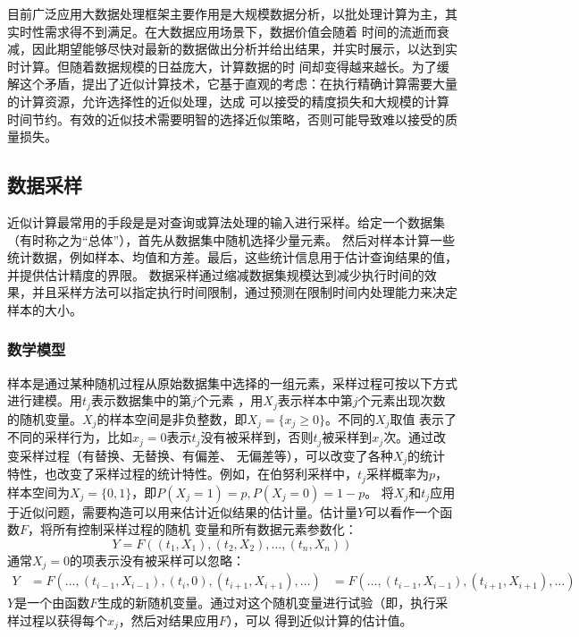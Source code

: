 \documentclass[master]{thesis-uestc}
\begin{document}
    目前广泛应用大数据处理框架主要作用是大规模数据分析，以批处理计算为主，其实时性需求得不到满足。在大数据应用场景下，数据价值会随着
时间的流逝而衰减，因此期望能够尽快对最新的数据做出分析并给出结果，并实时展示，以达到实时计算。但随着数据规模的日益庞大，计算数据的时
间却变得越来越长。为了缓解这个矛盾，提出了近似计算技术，它基于直观的考虑：在执行精确计算需要大量的计算资源，允许选择性的近似处理，达成
可以接受的精度损失和大规模的计算时间节约。有效的近似技术需要明智的选择近似策略，否则可能导致难以接受的质量损失。

\subsection{数据采样}
\label{subsec:sample}
    近似计算最常用的手段是是对查询或算法处理的输入进行采样。给定一个数据集（有时称之为“总体”），首先从数据集中随机选择少量元素。
然后对样本计算一些统计数据，例如样本、均值和方差。最后，这些统计信息用于估计查询结果的值，并提供估计精度的界限。
数据采样通过缩减数据集规模达到减少执行时间的效果，并且采样方法可以指定执行时间限制，通过预测在限制时间内处理能力来决定
样本的大小。
    
\subsubsection{数学模型}
\label{subsubsec:math-model}
    样本是通过某种随机过程从原始数据集中选择的一组元素，采样过程可按以下方式进行建模。用$t_j$表示数据集中的第$j$个元素
，用$X_j$表示样本中第$j$个元素出现次数的随机变量。$X_j$的样本空间是非负整数，即$X_j = \{x_j \ge 0\}$。不同的$X_j$取值
表示了不同的采样行为，比如$x_j = 0$表示$t_j$没有被采样到，否则$t_j$被采样到$x_j$次。通过改变采样过程（有替换、无替换、有偏差、
无偏差等），可以改变了各种$X_j$的统计特性，也改变了采样过程的统计特性。例如，在伯努利采样中，$t_j$采样概率为$p$，
样本空间为$X_j = \{0, 1\}$，即$P(X_j = 1) = p, P(X_j = 0) = 1-p$。
    将$X_j$和$t_j$应用于近似问题，需要构造可以用来估计近似结果的估计量。估计量$Y$可以看作一个函数$F$，将所有控制采样过程的随机
变量和所有数据元素参数化：
\begin{equation*}
    Y=F((t_1,X_1), (t_2,X_2),\ldots,(t_n,X_n))
\end{equation*}
通常$X_j = 0$的项表示没有被采样可以忽略：
\begin{equation*}
    \begin{aligned}
    Y&=F(\ldots,(t_{i-1},X_{i-1}), (t_i,0),(t_{i+1},X_{i+1}),\ldots)
    &=F(\ldots,(t_{i-1},X_{i-1}),(t_{i+1},X_{i+1}),\ldots)
    \end{aligned}
\end{equation*}
    $Y$是一个由函数$F$生成的新随机变量。通过对这个随机变量进行试验（即，执行采样过程以获得每个$x_j$，然后对结果应用$F$），可以
得到近似计算的估计值。
\end{document}
